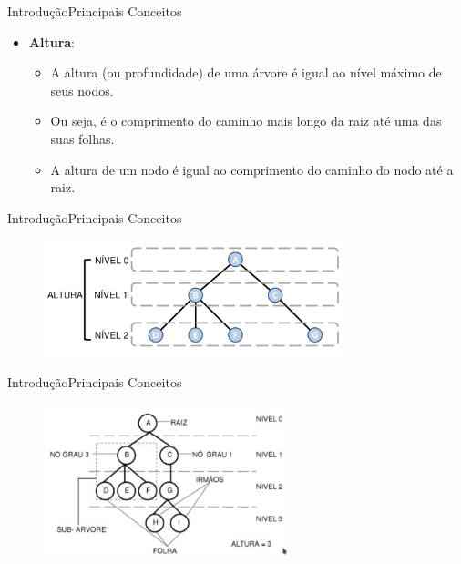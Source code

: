 \documentclass[aspectratio=169]{beamer}
\begin{document}
\begin{frame}{Introdução}{Principais Conceitos}
\begin{itemize}
 \item {\bf Altura}:
 \begin{itemize}
 \item A altura (ou profundidade) de uma árvore é igual ao nível máximo de seus nodos.
 \item Ou seja, é o comprimento do caminho mais longo da raiz até uma das suas folhas.
 \item A altura de um nodo é igual ao comprimento do caminho do nodo até a raiz.
 \end{itemize}
\end{itemize}
\end{frame}

\begin{frame}{Introdução}{Principais Conceitos}
\begin{figure}[!h]
  \centering
   \includegraphics[width=250pt]{imagens/altura.png}
  \label{fig_altura}
\end{figure}
\end{frame}


\begin{frame}{Introdução}{Principais Conceitos}
\begin{figure}[!h]
  \centering
   \includegraphics[width=200pt]{imagens/definicoes.png}
  \label{fig_definicoes}
\end{figure}
\end{frame}
\end{document}
